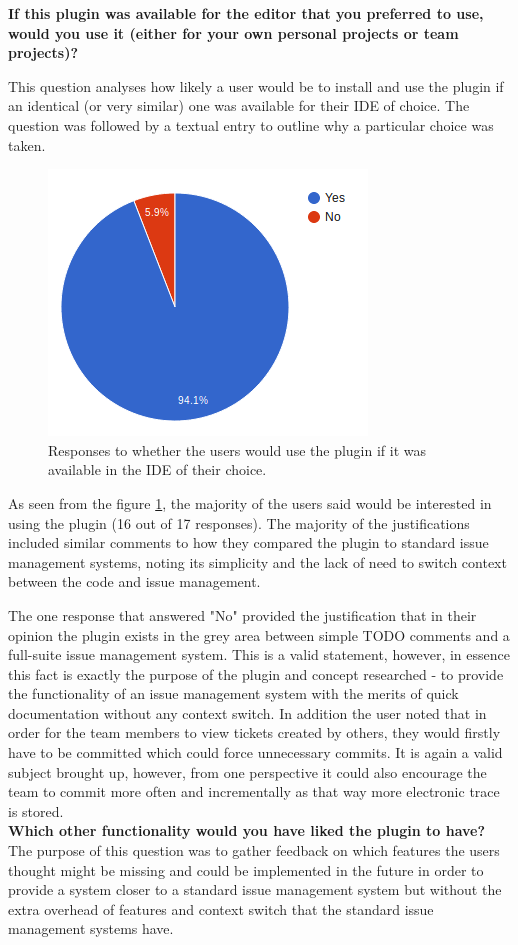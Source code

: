 \documentclass{4thYearProject}
\begin{document}
\textbf{If this plugin was available for the editor that you preferred to use, would you use it (either for your own personal projects or team projects)?}

This question analyses how likely a user would be to install and use the plugin if an identical (or very similar) one was available for their IDE of choice. The question was followed by a textual entry to outline why a particular choice was taken. 

\begin{figure}[H]
\includegraphics[scale=0.6]{Would_you_use}
\centering
\caption{Responses to whether the users would use the plugin if it was available in the IDE of their choice.}
\label{fig:wouldyouuse}
\end{figure}

As seen from the figure \ref{fig:wouldyouuse}, the majority of the users said would be interested in using the plugin (16 out of 17 responses). The majority of the justifications included similar comments to how they compared the plugin to standard issue management systems, noting its simplicity and the lack of need to switch context between the code and issue management. 

The one response that answered "No" provided the justification that in their opinion the plugin exists in the grey area between simple TODO comments and a full-suite issue management system. This is a valid statement, however, in essence this fact is exactly the purpose of the plugin and concept researched - to provide the functionality of an issue management system with the merits of quick documentation without any context switch. In addition the user noted that in order for the team members to view tickets created by others, they would firstly have to be committed which could force unnecessary commits. It is again a valid subject brought up, however, from one perspective it could also encourage the team to commit more often and incrementally as that way more electronic trace is stored.\\
\newline
\textbf{Which other functionality would you have liked the plugin to have?}
\newline
The purpose of this question was to gather feedback on which features the users thought might be missing and could be implemented in the future in order to provide a system closer to a standard issue management system but without the extra overhead of features and context switch that the standard issue management systems have.
\end{document}

